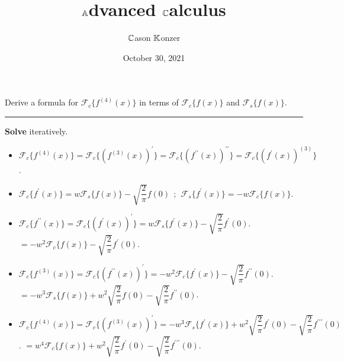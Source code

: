 \documentclass[10pt]{article}
\title{$\mathbb{A}$dvanced $\mathbb{C}$alculus}
\author{$\mathbb{C}$ason $\mathbb{K}$onzer}
\date{October 30, 2021}
\begin{document}
\maketitle

\newpage

\section{\underline{}}
\label{sec: Problem 1}
\noindent
Derive a formula for $ \mathcal{F}_c\{f^{(4)}(x)\} $ in terms of $ \mathcal{F}_c\{f(x)\} $ and $ \mathcal{F}_s\{f(x)\} $. \\
\vspace{2.5mm}
\hrule

\vspace{7.5mm}

\noindent
\textbf{Solve} iteratively. \\

\begin{itemize}
    \item $ \mathcal{F}_c\{f^{(4)}(x)\} = \mathcal{F}_c\{(f^{(3)}(x))^\prime\}
    = \mathcal{F}_c\{(f^{\prime\prime}(x))^{\prime\prime}\}
    = \mathcal{F}_c\{(f^{\prime}(x))^{(3)}\} $.
    \vspace{2.5mm}
    \item $ \displaystyle \mathcal{F}_c\{f^{\prime}(x)\} = w\mathcal{F}_s\{f(x)\} - \sqrt{\dfrac{2}{\pi}}f(0) \ \
    ; \ \ \mathcal{F}_s\{f^{\prime}(x)\} = -w\mathcal{F}_c\{f(x)\} $.
    \vspace{2.5mm}
    \item $ \displaystyle \mathcal{F}_c\{f^{\prime\prime}(x)\}
    = \mathcal{F}_c\{(f^{\prime}(x))^{\prime}\}
    = w\mathcal{F}_s\{f^{\prime}(x)\} - \sqrt{\dfrac{2}{\pi}}f^{\prime}(0) $.
    \vspace{2.5mm}
    \subitem $ \displaystyle = -w^2\mathcal{F}_c\{f(x)\} - \sqrt{\dfrac{2}{\pi}}f^{\prime}(0) $.
    \vspace{2.5mm}
    \item $ \displaystyle \mathcal{F}_c\{f^{(3)}(x)\}
    = \mathcal{F}_c\{(f^{\prime\prime}(x))^{\prime}\}
    = -w^2\mathcal{F}_c\{f^{\prime}(x)\} - \sqrt{\dfrac{2}{\pi}}f^{\prime\prime}(0) $.
    \vspace{2.5mm}
    \subitem $ \displaystyle = -w^3\mathcal{F}_s\{f(x)\} + w^2\sqrt{\dfrac{2}{\pi}}f(0) - \sqrt{\dfrac{2}{\pi}}f^{\prime\prime}(0) $.
    \vspace{2.5mm}
    \item $ \displaystyle \mathcal{F}_c\{f^{(4)}(x)\}
    = \mathcal{F}_c\{(f^{(3)}(x))^{\prime}\}
    = -w^3\mathcal{F}_s\{f^{\prime}(x)\} + w^2\sqrt{\dfrac{2}{\pi}}f^{\prime}(0) - \sqrt{\dfrac{2}{\pi}}f^{\prime\prime\prime}(0) $.
    \vspace{2.5mm}
    \subitem $ \displaystyle = w^4\mathcal{F}_c\{f(x)\} + w^2\sqrt{\dfrac{2}{\pi}}f^{\prime}(0) - \sqrt{\dfrac{2}{\pi}}f^{\prime\prime\prime}(0) $.
\end{itemize}
\end{document}
